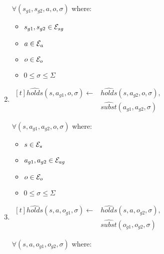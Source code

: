 \documentclass[10pt, twocolumn]{article}
\begin{document}
\begin{enumerate}
                $\forall (s_{g1}, s_{g2}, a, o, \sigma)$ where:

                \begin{itemize}
                  \item
                    $s_{g1}, s_{g2} \in {\cal E}_{sg}$
                  \item
                    $a \in {\cal E}_{a}$
                  \item
                    $o \in {\cal E}_{o}$
                  \item
                    $0 \leq \sigma \leq \Sigma$
                \end{itemize}
              \item
                \begin{math}
                  \begin{aligned}[t]
                    \hat{holds}(s, a_{g1}, o, \sigma) \leftarrow &
                    \hat{holds}(s, a_{g2}, o, \sigma), \\
                    & \hat{subst}(a_{g1}, a_{g2}, \sigma)
                  \end{aligned}
                \end{math}

                $\forall (s, a_{g1}, a_{g2}, o, \sigma)$ where:

                \begin{itemize}
                  \item
                    $s \in {\cal E}_{s}$
                  \item
                    $a_{g1}, a_{g2} \in {\cal E}_{ag}$
                  \item
                    $o \in {\cal E}_{o}$
                  \item
                    $0 \leq \sigma \leq \Sigma$
                \end{itemize}
                \item
                \begin{math}
                  \begin{aligned}[t]
                    \hat{holds}(s, a, o_{g1}, \sigma) \leftarrow &
                    \hat{holds}(s, a, o_{g2}, \sigma), \\
                    & \hat{subst}(o_{g1}, o_{g2}, \sigma)
                  \end{aligned}
                \end{math}

                $\forall (s, a, o_{g1}, o_{g2}, \sigma)$ where:


\end{enumerate}
\end{document}
